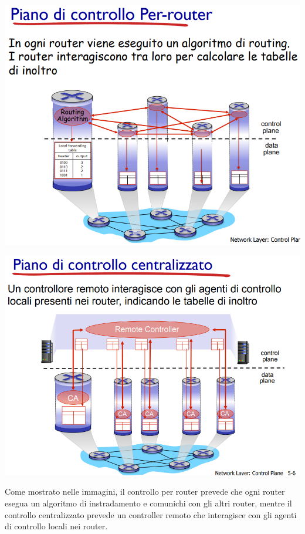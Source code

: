 \begin{center}
\begin{minipage}{0.48\textwidth}
    \includegraphics[width=\textwidth]{./img/perrouter.png}
\end{minipage}\hfill
\begin{minipage}{0.48\textwidth}
    \includegraphics[width=\textwidth]{./img/centralizzato.png}
\end{minipage}
\end{center}

Come mostrato nelle immagini, il controllo per router prevede che ogni router esegua un algoritmo di instradamento e comunichi con gli altri router, mentre il controllo centralizzato prevede un controller remoto che interagisce con gli agenti di controllo locali nei router.

